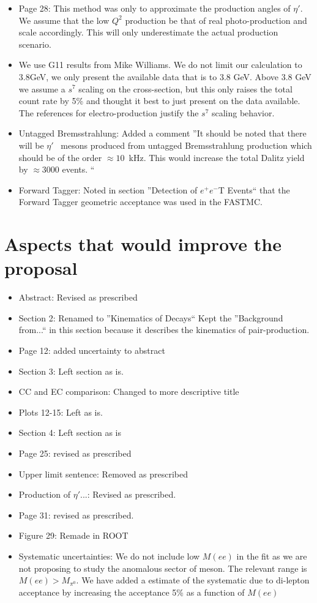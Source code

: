 \documentclass[10pt,a4paper]{report}
\begin{document}
\begin{itemize}
		\item Page 28: This method was only to approximate the production angles of $\eta'$. We assume that the low $Q^2$ production be that of real photo-production and scale accordingly. This will only underestimate the actual production scenario.
		\item We use G11 results from Mike Williams. We do not limit our calculation to 3.8GeV, we only present the available data that is to 3.8 GeV. Above 3.8 GeV we assume a $s^7$ scaling on the cross-section, but this only raises the total count rate by 5\% and thought it best to just present on the data available. The references for electro-production justify the $s^7$ scaling behavior. 
		\item Untagged Bremsstrahlung: Added a comment ''It should be noted that there will be $\eta'$ \ mesons produced from untagged Bremsstrahlung production which should be of the order $\approx 10$~kHz. This would increase the total Dalitz yield by $\approx$3000 events. ``
		\item Forward Tagger: Noted in section ''Detection of $e^+e^-$T Events`` that the Forward Tagger geometric acceptance was used in the FASTMC.
	\end{itemize}
\section*{Aspects that would improve the proposal}		
	\begin{itemize}
		\item Abstract: Revised as prescribed
		\item Section 2: Renamed to ''Kinematics of Decays`` Kept the ''Background from...`` in this section because it describes the kinematics of pair-production.
		\item Page 12: added uncertainty to abstract
		\item Section 3: Left section as is.
		\item CC and EC comparison: Changed to more descriptive title
		\item Plots 12-15: Left as is.
		\item Section 4: Left section as is
		\item Page 25: revised as prescribed
		\item Upper limit sentence: Removed as prescribed
		\item Production of $\eta'$...: Revised as prescribed.
		\item Page 31: revised as prescribed.
		\item Figure 29: Remade in ROOT
		\item Systematic uncertainties: We do not include low $M(ee)$ in the fit as we are not proposing to study the anomalous sector of meson. The relevant range is $M(ee)>M_{\pi^0}$. We have added a estimate of the systematic due to di-lepton acceptance by increasing the acceptance 5\% as a function of $M(ee)$
		
		
		
	\end{itemize}
\end{document}

